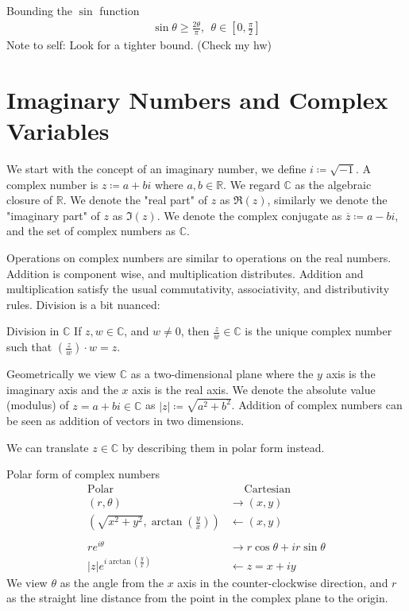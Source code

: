 \documentclass{article}
\begin{document}
\begin{misc}{Bounding the \( \sin \) function}{}
\begin{align*}
    \sin \theta \geq \frac{2\theta }{\pi }, \ \ \theta \in \left[ 0, \frac{\pi}{2} \right]  
\end{align*}
Note to self: Look for a tighter bound. (Check my hw)
\end{misc}


\newpage 

\section{Imaginary Numbers and Complex Variables}

We start with the concept of an imaginary number, we define \( i \coloneqq \sqrt{- 1}  \). A complex number is \( z \coloneqq a + bi \) where \( a, b \in \mathbb{R} \). We regard \( \mathbb{C}  \) as the algebraic closure of \( \mathbb{R}  \). We denote the "real part" of \( z \) as \( \Re (z) \), similarly we denote the "imaginary part" of \( z \) as \( \Im (z) \). We denote the complex conjugate as \( \overline{z} \coloneqq a - bi \), and the set of complex numbers as \( \mathbb{C} \). 

Operations on complex numbers are similar to operations on the real numbers. Addition is component wise, and multiplication distributes. Addition and multiplication satisfy the usual commutativity, associativity, and distributivity rules. Division is a bit nuanced:
\begin{misc}{Division in \( \mathbb{C} \) }{}
If \( z,w \in \mathbb{C}  \), and \( w \neq 0 \), then \( \frac{z}{w} \in \mathbb{C}  \) is the unique complex number such that \( (\frac{z}{w})\cdot w = z. \) 
\end{misc}

Geometrically we view \( \mathbb{C} \) as a two-dimensional plane where the \( y \) axis is the imaginary axis and the \( x \) axis is the real axis. We denote the absolute value (modulus) of \( z = a + bi\in \mathbb{C} \) as \( \left\lvert z \right\rvert \coloneqq \sqrt{a^{2} + b^{2} }  \). Addition of complex numbers can be seen as addition of vectors in two dimensions. 

We can translate \(  z \in \mathbb{C}  \) by describing them in polar form instead. 
\begin{misc}{Polar form of complex numbers}{}
\begin{align*}
    \text{Polar }&  \quad \text{ Cartesian} \\
    (r, \theta )& \to (x,y) \\
    (\sqrt{x^{2} + y^{2}}, \arctan (\frac{y}{x}))& \leftarrow (x,y)\\
    \\
    re^{i \theta }& \to r\cos \theta + ir\sin \theta \\
    |z|e^{i\arctan (\frac{y}{x})}& \leftarrow z = x + iy  
\end{align*}
We view \( \theta  \) as the angle from the \( x \) axis in the counter-clockwise direction, and \( r \) as the straight line distance from the point in the complex plane to the origin. 
\end{misc}
\end{document}
